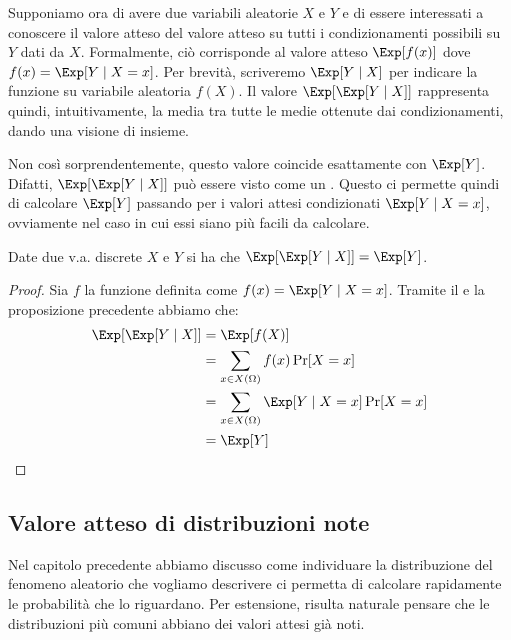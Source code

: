 \documentclass[a4paper, 12pt]{report}
\begin{document}
    Supponiamo ora di avere due variabili aleatorie $X$ e $Y$ e di essere interessati a conoscere il valore atteso del valore atteso su tutti i condizionamenti possibili su $Y$ dati da $X$. Formalmente, ciò corrisponde al valore atteso $\Exp[f(x)]$ dove $f(x) = \Exp[Y \mid X = x]$. Per brevità, scriveremo $\Exp[Y \mid X]$ per indicare la funzione su variabile aleatoria $f(X)$. Il valore $\Exp[\Exp[Y \mid X]]$ rappresenta quindi, intuitivamente, la media tra tutte le medie ottenute dai condizionamenti, dando una visione di insieme.
    
    Non così sorprendentemente, questo valore coincide esattamente con $\Exp[Y]$. Difatti, $\Exp[\Exp[Y \mid X]]$ può essere visto come un . Questo ci permette quindi di calcolare $\Exp[Y]$ passando per i valori attesi condizionati $\Exp[Y \mid X = x]$, ovviamente nel caso in cui essi siano più facili da calcolare.

    \begin{framedthm}{}
        Date due v.a. discrete $X$ e $Y$ si ha che $\Exp[\Exp[Y \mid X]] = \Exp[Y]$.
    \end{framedthm}

    \begin{proof}
        Sia $f$ la funzione definita come $f(x) = \Exp[Y \mid X = x]$. Tramite il  e la proposizione precedente abbiamo che:
        \[\begin{split}
            \Exp[\Exp[Y \mid X]] &= \Exp[f(X)] \\
            &= \sum_{x \in X(\Omega)} f(x) \Pr[X = x] \\
            &= \sum_{x \in X(\Omega)} \Exp[Y \mid X = x] \Pr[X = x] \\
            &= \Exp[Y] \\
        \end{split}\]
    \end{proof}


    \subsection{Valore atteso di distribuzioni note}
    \label{exp_noti}

    Nel capitolo precedente abbiamo discusso come individuare la distribuzione del fenomeno aleatorio che vogliamo descrivere ci permetta di calcolare rapidamente le probabilità che lo riguardano. Per estensione, risulta naturale pensare che le distribuzioni più comuni abbiano dei valori attesi già noti.
\end{document}

